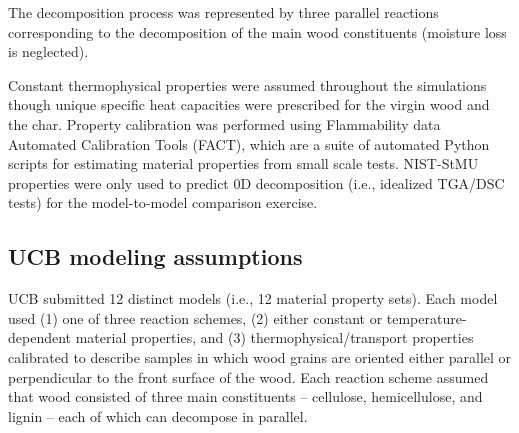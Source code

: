 \documentclass{article}
\begin{document}
The decomposition process was represented by three parallel reactions corresponding to the decomposition of the main wood constituents (moisture loss is neglected). 

Constant thermophysical properties were assumed throughout the simulations though unique specific heat capacities were prescribed for the virgin wood and the char. Property calibration was performed using Flammability data Automated Calibration Tools (FACT), which are a suite of automated Python scripts for estimating material properties from small scale tests.
 NIST-StMU properties were only used to predict 0D decomposition (i.e., idealized TGA/DSC tests) for the model-to-model comparison exercise.

\subsection{UCB modeling assumptions}
UCB submitted 12 distinct models (i.e., 12 material property sets). Each model used (1) one of three reaction schemes, (2) either constant or temperature-dependent material properties, and (3) thermophysical/transport properties calibrated to describe samples in which wood grains are oriented either parallel or perpendicular to the front surface of the wood. Each reaction scheme assumed that wood consisted of three main constituents -- cellulose, hemicellulose, and lignin -- each of which can decompose in parallel. 
\end{document}
